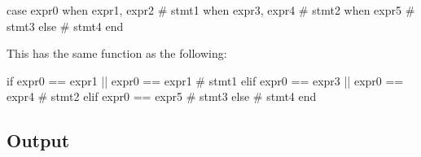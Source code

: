 \documentclass[11pt]{article}
\newcommand{\sectionkeyword}[1]{ \vspace{3mm} \centerline{\colorbox{black}{\color{white}{\textbf{{\large #1}}}}} \vspace{3mm} }
\begin{document}
\sectionkeyword{case}

\begin{rubycode}
case expr0
when expr1, expr2
  # stmt1
when expr3, expr4
  # stmt2
when expr5
  # stmt3    
else
  # stmt4  
end
\end{rubycode}


This has the same function as the following: \\
\begin{rubycode}
if expr0 == expr1 || expr0 == expr1
  # stmt1
elif expr0 == expr3 || expr0 == expr4
  # stmt2
elif expr0 == expr5
  # stmt3
else
  # stmt4
end        
\end{rubycode}

\subsection{Output}
\end{document}
